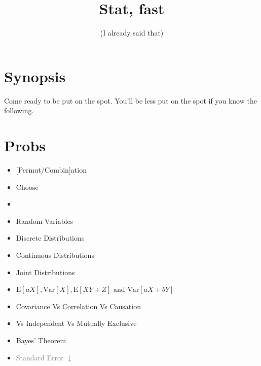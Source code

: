 \documentclass[11pt, oneside]{article}
\title{Stat, fast}
\author{(I already said that)} %
\begin{document}
\maketitle

\section{Synopsis}
Come ready to be put on the spot. You'll be less put on the spot if you know the following.

\section{Probs}

\begin{minipage}{0.4\linewidth} 
\begin{itemize}
\item {[}Permut/Combin{]}ation
\item Choose
\item[] ${}$
\item Random Variables
\item Discrete Distributions
\item Continuous Distributions
\end{itemize}
\end{minipage}
\begin{minipage}{.65\linewidth} 
\begin{itemize}
\item Joint Distributions
\item $\textrm{E}[aX], \textrm{Var}[X], \textrm{E}[XY+Z]$ and $\textrm{Var}[aX+bY]$
\item Covariance Vs Correlation Vs Causation
\item[] Vs Independent Vs Mutually Exclusive
\item Bayes' Theorem
\item \textcolor{gray}{Standard Error $\downarrow$} 
\end{itemize}
\end{minipage}
\end{document}
